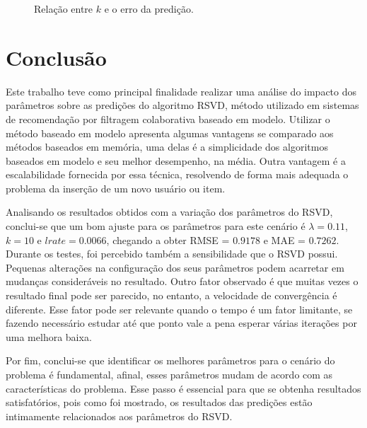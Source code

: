 \documentclass[12pt]{article}
\begin{document}
\begin{figure}[!ht]
\begin{center}
\end{center}
\caption{Relação entre $k$ e o erro da predição. }
\label{grafico:k}
\end{figure}

\section{Conclusão}

Este trabalho teve como principal finalidade realizar uma análise do impacto dos parâmetros sobre as predições do algoritmo RSVD, método utilizado em sistemas de recomendação por filtragem colaborativa baseado em modelo. Utilizar o método baseado em modelo apresenta algumas vantagens se comparado aos métodos baseados em memória, uma delas é a simplicidade dos algoritmos baseados em modelo e seu melhor desempenho, na média. Outra vantagem é a escalabilidade fornecida por essa técnica, resolvendo de forma mais adequada o problema da inserção de um novo usuário ou item.

Analisando os resultados obtidos com a variação dos parâmetros do RSVD, conclui-se que um bom ajuste para os parâmetros para este cenário é $\lambda = 0.11$, $k = 10$ e $lrate = 0.0066$, chegando a obter RMSE = $0.9178$ e MAE = $0.7262$. Durante os testes, foi percebido também a sensibilidade que o RSVD possui. Pequenas alterações na configuração dos seus parâmetros podem acarretar em mudanças consideráveis no resultado. Outro fator observado é que muitas vezes o resultado final pode ser parecido, no entanto, a velocidade de convergência é diferente. Esse fator pode ser relevante quando o tempo é um fator limitante, se fazendo necessário estudar até que ponto vale a pena esperar várias iterações por uma melhora baixa.

Por fim, conclui-se que identificar os melhores parâmetros para o cenário do problema é fundamental, afinal, esses parâmetros mudam de acordo com as características do problema. Esse passo é essencial para que se obtenha resultados satisfatórios, pois como foi mostrado, os resultados das predições estão intimamente relacionados aos parâmetros do RSVD.
\end{document}
